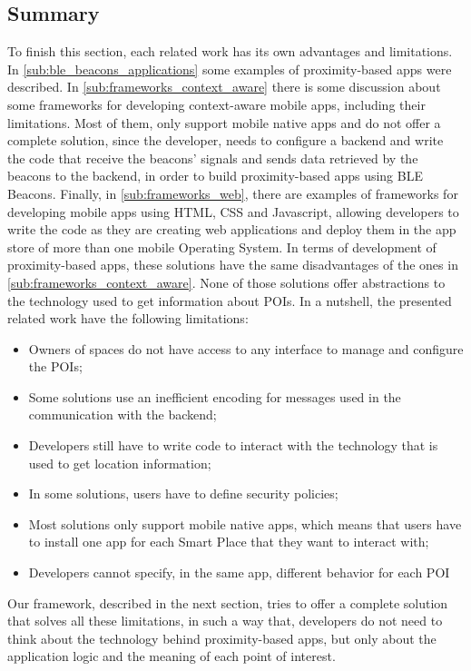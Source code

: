 \subsection{Summary}
\label{sub:summary}
To finish this section, each related work has its own
advantages and limitations.
In \ref{sub:ble_beacons_applications} some
examples of proximity-based apps were described.
In \ref{sub:frameworks_context_aware} there is
some discussion about some
frameworks for developing context-aware mobile apps,
including their limitations.
Most of them, only support mobile native apps and
do not offer a complete solution, since the developer,
needs to configure a backend and write the code that
receive the beacons' signals and sends data retrieved by 
the beacons to the backend, in order to build 
proximity-based apps using BLE Beacons.
Finally, in \ref{sub:frameworks_web}, there are
examples of frameworks for developing mobile apps
using HTML, CSS and Javascript, allowing developers
to write the code as they are creating web applications
and deploy them in the app store of more than one
mobile Operating System.
In terms of development of proximity-based apps,
these solutions have the same disadvantages of the
ones in \ref{sub:frameworks_context_aware}.
None of those solutions offer abstractions to
the technology used to get information about POIs.
In a nutshell, the presented related work have
the following limitations:
\begin{itemize}
\item Owners of spaces do not have access to
any interface to manage and configure the POIs;
\item Some solutions use an inefficient encoding
for messages used in the communication with
the backend;
\item Developers still have to write code to
interact with the technology that is used to
get location information;
\item In some solutions, users have to define
security policies;
\item Most solutions only support mobile native
apps, which means that users have to install
one app for each Smart Place that they want
to interact with;
\item Developers cannot specify, in the same app,
different behavior for each POI
\end{itemize}
Our framework, described in the next section, tries 
to offer a complete solution that solves all
these limitations, in such a way that, developers do not
need to think about the technology behind proximity-based
apps, but only about the application logic and the meaning
of each point of interest.